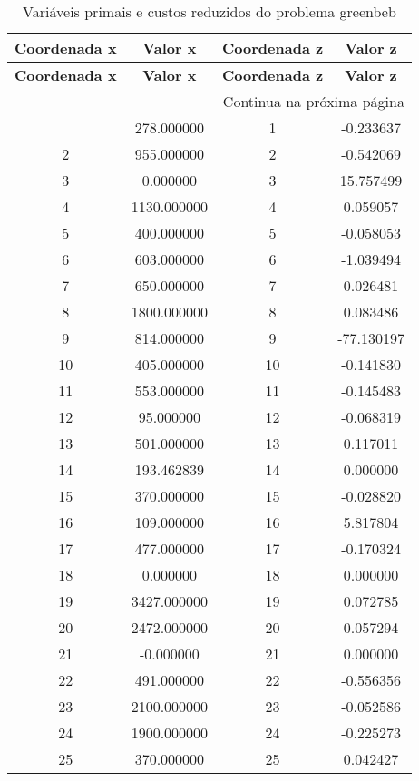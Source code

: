 \documentclass[12pt]{article}
\begin{document}
\begin{longtable}{@{}cccc@{}}
\caption{Variáveis primais e custos reduzidos do problema greenbeb} \\
\toprule
\textbf{Coordenada x} & \textbf{Valor x} & \textbf{Coordenada z} & \textbf{Valor z} \\
\midrule
\endfirsthead

\toprule
\textbf{Coordenada x} & \textbf{Valor x} & \textbf{Coordenada z} & \textbf{Valor z} \\
\midrule
\endhead

\midrule \multicolumn{4}{r}{{Continua na próxima página}} \\ \midrule
\endfoot

\bottomrule
\endlastfoot
1 & 278.000000 & 1 & -0.233637 \\
2 & 955.000000 & 2 & -0.542069 \\
3 & 0.000000 & 3 & 15.757499 \\
4 & 1130.000000 & 4 & 0.059057 \\
5 & 400.000000 & 5 & -0.058053 \\
6 & 603.000000 & 6 & -1.039494 \\
7 & 650.000000 & 7 & 0.026481 \\
8 & 1800.000000 & 8 & 0.083486 \\
9 & 814.000000 & 9 & -77.130197 \\
10 & 405.000000 & 10 & -0.141830 \\
11 & 553.000000 & 11 & -0.145483 \\
12 & 95.000000 & 12 & -0.068319 \\
13 & 501.000000 & 13 & 0.117011 \\
14 & 193.462839 & 14 & 0.000000 \\
15 & 370.000000 & 15 & -0.028820 \\
16 & 109.000000 & 16 & 5.817804 \\
17 & 477.000000 & 17 & -0.170324 \\
18 & 0.000000 & 18 & 0.000000 \\
19 & 3427.000000 & 19 & 0.072785 \\
20 & 2472.000000 & 20 & 0.057294 \\
21 & -0.000000 & 21 & 0.000000 \\
22 & 491.000000 & 22 & -0.556356 \\
23 & 2100.000000 & 23 & -0.052586 \\
24 & 1900.000000 & 24 & -0.225273 \\
25 & 370.000000 & 25 & 0.042427 \\

\end{longtable}
\end{document}

